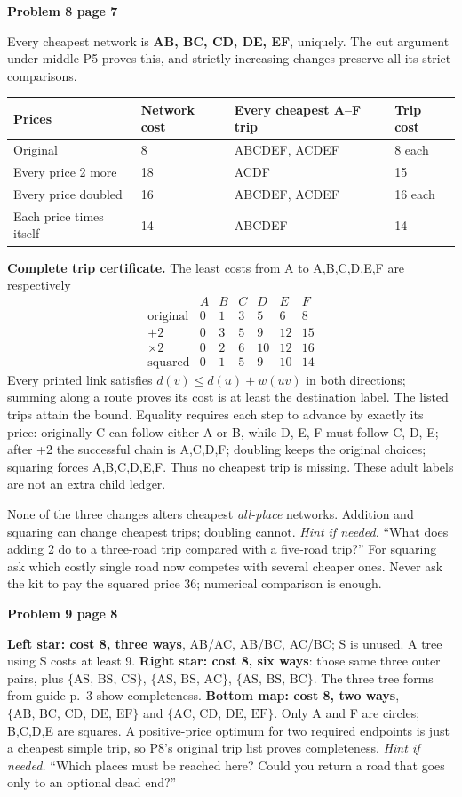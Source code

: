 \documentclass[11pt]{article}
\newcommand{\sub}[1]{\par\textbf{#1}\par}
\newcommand{\hint}[1]{\textit{Hint if needed.} #1}
\newcommand{\links}[1]{\ensuremath{\{\text{#1}\}}}
\begin{document}
\sub{Problem 8 page 7}
Every cheapest network is \textbf{AB, BC, CD, DE, EF}, uniquely. The cut argument under middle P5 proves this, and strictly increasing changes preserve all its strict comparisons.
\begin{center}\small
\begin{tabular}{llll}
Prices & Network cost & Every cheapest A--F trip & Trip cost\\\midrule
Original & 8 & ABCDEF, ACDEF & 8 each\\
Every price 2 more & 18 & ACDF & 15\\
Every price doubled & 16 & ABCDEF, ACDEF & 16 each\\
Each price times itself & 14 & ABCDEF & 14
\end{tabular}
\end{center}
\textbf{Complete trip certificate.} The least costs from A to A,B,C,D,E,F are respectively
\[
\begin{array}{c|rrrrrr}
 &A&B&C&D&E&F\\\hline
\text{original}&0&1&3&5&6&8\\
+2&0&3&5&9&12&15\\
\times2&0&2&6&10&12&16\\
\text{squared}&0&1&5&9&10&14
\end{array}
\]
Every printed link satisfies $d(v)\le d(u)+w(uv)$ in both directions; summing along a route proves its cost is at least the destination label. The listed trips attain the bound. Equality requires each step to advance by exactly its price: originally C can follow either A or B, while D, E, F must follow C, D, E; after +2 the successful chain is A,C,D,F; doubling keeps the original choices; squaring forces A,B,C,D,E,F. Thus no cheapest trip is missing. These adult labels are not an extra child ledger.

None of the three changes alters cheapest \emph{all-place} networks. Addition and squaring can change cheapest trips; doubling cannot. \hint{``What does adding 2 do to a three-road trip compared with a five-road trip?''} For squaring ask which costly single road now competes with several cheaper ones. Never ask the kit to pay the squared price 36; numerical comparison is enough.

\sub{Problem 9 page 8}
\textbf{Left star: cost 8, three ways}, AB/AC, AB/BC, AC/BC; S is unused. A tree using S costs at least 9. \textbf{Right star: cost 8, six ways}: those same three outer pairs, plus \links{AS, BS, CS}, \links{AS, BS, AC}, \links{AS, BS, BC}. The three tree forms from guide p.~3 show completeness. \textbf{Bottom map: cost 8, two ways}, \links{AB, BC, CD, DE, EF} and \links{AC, CD, DE, EF}. Only A and F are circles; B,C,D,E are squares. A positive-price optimum for two required endpoints is just a cheapest simple trip, so P8's original trip list proves completeness. \hint{``Which places must be reached here? Could you return a road that goes only to an optional dead end?''}
\end{document}
